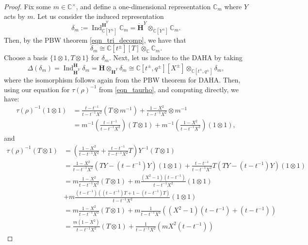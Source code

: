 \documentclass[a4paper]{report}
\theoremstyle{theorem}
\theoremstyle{definition}
\theoremstyle{remark}
\theoremstyle{proposition}
\theoremstyle{conjecture}
\theoremstyle{lemma}
\theoremstyle{corollary}
\theoremstyle{exercise}
\theoremstyle{example}
\newcommand{\C}{\mathbb{C}}
\newcommand{\on}{\operatorname}
\begin{document}
  \begin{proof}
      Fix some $m \in \C^\times$, and define a one-dimensional 
      representation $\C_m$ where $Y$ acts by $m$. 
      Let us consider the induced representation
      $$\delta_m := \on{Ind}_{\C[Y^\pm]}^{\mathbf{\dot{H}}^Y} \C_m = \mathbf{\dot{H}}^Y \otimes_{\C[Y^\pm]} \C_m.$$
      Then, by the PBW theorem \eqref{eqn_tri_decomp}, we have that 
      $$\delta_m \cong \C[t^\pm][T] \otimes_\C \C_m.$$ 
      Choose a basis $\lbrace 1\otimes 1, T\otimes 1\rbrace$ 
      for $\delta_m$.
      Next, let us induce to the DAHA by taking
      $$\Delta(\delta_m) = \on{Ind}_{\mathbf{\dot{H}}^Y}^{\mathbf{\ddot{\mathbf{H}}}} \delta_m = \ddot{\mathbf{H}} \otimes_{\mathbf{\dot{H}}^Y} \delta_m \cong \C[t^\pm,q^\pm][X^\pm] \otimes_{\C[t^\pm,q^\pm]} \delta_m,$$
      where the isomorphism follows again from the PBW theorem for DAHA. 
      Then, using our equation for $\tau(\rho)^{-1}$ from 
      \eqref{eqn_taurho}, and computing directly, we have:
      \begin{align*}
          \tau(\rho)^{-1}(1\otimes 1) &= \frac{t-t^{-1}}{t-t^{-1}X^2} (T\otimes m^{-1}) + \frac{1-X^2}{t-t^{-1}X^2} \otimes m^{-1}\\
                                      &= m^{-1}\left(\frac{t-t^{-1}}{t-t^{-1}X^2}\right)(T \otimes 1) + m^{-1}\left(\frac{1-X^2}{t-t^{-1}X^2}\right)(1\otimes 1),
      \end{align*} and 
      \begin{align*}
          \tau(\rho)^{-1} (T\otimes 1) &= \left(\frac{1-X^2}{t-t^{-1}X^2} + \frac{t-t^{-1}}{t-t^{-1}X^2}T\right)Y^{-1}(T\otimes 1)\\
                                       &= \frac{1-X^2}{t-t^{-1}X^2}(TY-(t-t^{-1})Y)(1\otimes 1) + \frac{t-t^{-1}}{t-t^{-1}X^2}T(TY - (t-t^{-1})Y)(1\otimes 1)\\
                                       &= m\frac{1-X^2}{t-t^{-1}X^2}(T\otimes 1) + m\frac{(X^2-1)(t-t^{-1})}{t-t^{-1}X^2}(1\otimes 1)\\
                                       &+ m\frac{(t-t^{-1})\left( (t-t^{-1})T + 1 -(t-t^{-1})T\right)}{t-t^{-1}X^2}(1\otimes 1)\\
                                       &= m\frac{1-X^2}{t-t^{-1}X^2}(T\otimes 1) + m\frac{1}{t-t^{-1}X^2}\left( (X^2-1)(t-t^{-1}) + (t-t^{-1})\right)\\
                                       &= \frac{m(1-X^2)}{t-t^{-1}X^2}(T\otimes 1) + \frac{1}{t-t^{-1}X^2} (mX^2(t-t^{-1}))
      \end{align*}

\end{proof}
\end{document}
